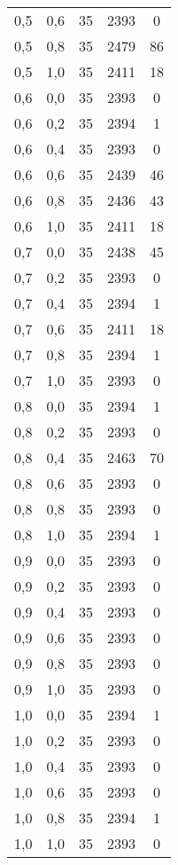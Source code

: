 \begin{center}
\begin{scriptsize}
\begin{longtable}[h]{| c | c | c || c | c |}
			0,5 & 0,6 & 35 & 2393 & 0        \\
			0,5 & 0,8 & 35 & 2479 & 86       \\
			0,5 & 1,0 & 35 & 2411 & 18       \\
			\hline
			0,6 & 0,0 & 35 & 2393 & 0        \\
			0,6 & 0,2 & 35 & 2394 & 1        \\
			0,6 & 0,4 & 35 & 2393 & 0        \\
			0,6 & 0,6 & 35 & 2439 & 46       \\
			0,6 & 0,8 & 35 & 2436 & 43       \\
			0,6 & 1,0 & 35 & 2411 & 18       \\
			\hline
			0,7 & 0,0 & 35 & 2438 & 45       \\
			0,7 & 0,2 & 35 & 2393 & 0        \\
			0,7 & 0,4 & 35 & 2394 & 1        \\
			0,7 & 0,6 & 35 & 2411 & 18       \\
			0,7 & 0,8 & 35 & 2394 & 1        \\
			0,7 & 1,0 & 35 & 2393 & 0        \\
			\hline
			0,8 & 0,0 & 35 & 2394 & 1        \\
			0,8 & 0,2 & 35 & 2393 & 0        \\
			0,8 & 0,4 & 35 & 2463 & 70       \\
			0,8 & 0,6 & 35 & 2393 & 0        \\
			0,8 & 0,8 & 35 & 2393 & 0        \\
			0,8 & 1,0 & 35 & 2394 & 1        \\
			\hline
			0,9 & 0,0 & 35 & 2393 & 0        \\
			0,9 & 0,2 & 35 & 2393 & 0        \\
			0,9 & 0,4 & 35 & 2393 & 0        \\
			0,9 & 0,6 & 35 & 2393 & 0        \\
			0,9 & 0,8 & 35 & 2393 & 0        \\
			0,9 & 1,0 & 35 & 2393 & 0        \\
			\hline
			1,0 & 0,0 & 35 & 2394 & 1        \\
			1,0 & 0,2 & 35 & 2393 & 0        \\
			1,0 & 0,4 & 35 & 2393 & 0        \\
			1,0 & 0,6 & 35 & 2393 & 0        \\
			1,0 & 0,8 & 35 & 2394 & 1        \\
			1,0 & 1,0 & 35 & 2393 & 0        \\
			\hline
		\end{longtable}
	\end{scriptsize}
\end{center}

